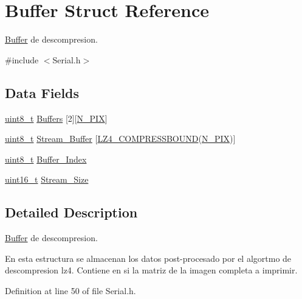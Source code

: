 \hypertarget{structBuffer}{}\section{Buffer Struct Reference}
\label{structBuffer}


\mbox{\hyperlink{structBuffer}{Buffer}} de descompresion.  




{\ttfamily \#include $<$Serial.\+h$>$}

\subsection*{Data Fields}
\begin{DoxyCompactItemize}
\item 
\mbox{\hyperlink{RegsLPC1769_8h_aba7bc1797add20fe3efdf37ced1182c5}{uint8\+\_\+t}} \mbox{\hyperlink{structBuffer_aa46fd86a8467fd9c22e27aecd2ce5a6c}{Buffers}} \mbox{[}2\mbox{]}\mbox{[}\mbox{\hyperlink{Serial_8h_af6da69ccda8aa07b1fafe1db53bd4051}{N\+\_\+\+P\+IX}}\mbox{]}
\item 
\mbox{\hyperlink{RegsLPC1769_8h_aba7bc1797add20fe3efdf37ced1182c5}{uint8\+\_\+t}} \mbox{\hyperlink{structBuffer_a8f92727e7b44eade72f7770483f92e40}{Stream\+\_\+\+Buffer}} \mbox{[}\mbox{\hyperlink{lz4_8h_a2453a423fd34640a0afbbf57ed0a5399}{L\+Z4\+\_\+\+C\+O\+M\+P\+R\+E\+S\+S\+B\+O\+U\+ND}}(\mbox{\hyperlink{Serial_8h_af6da69ccda8aa07b1fafe1db53bd4051}{N\+\_\+\+P\+IX}})\mbox{]}
\item 
\mbox{\hyperlink{RegsLPC1769_8h_aba7bc1797add20fe3efdf37ced1182c5}{uint8\+\_\+t}} \mbox{\hyperlink{structBuffer_a4b7b77de63c2c7d070aed73400f06d61}{Buffer\+\_\+\+Index}}
\item 
\mbox{\hyperlink{RegsLPC1769_8h_a273cf69d639a59973b6019625df33e30}{uint16\+\_\+t}} \mbox{\hyperlink{structBuffer_ad2ce1666d61d13e70634895da5a90696}{Stream\+\_\+\+Size}}
\end{DoxyCompactItemize}


\subsection{Detailed Description}
\mbox{\hyperlink{structBuffer}{Buffer}} de descompresion. 

En esta estructura se almacenan los datos post-\/procesado por el algortmo de descompresion lz4. Contiene en si la matriz de la imagen completa a imprimir. 

Definition at line 50 of file Serial.\+h.



